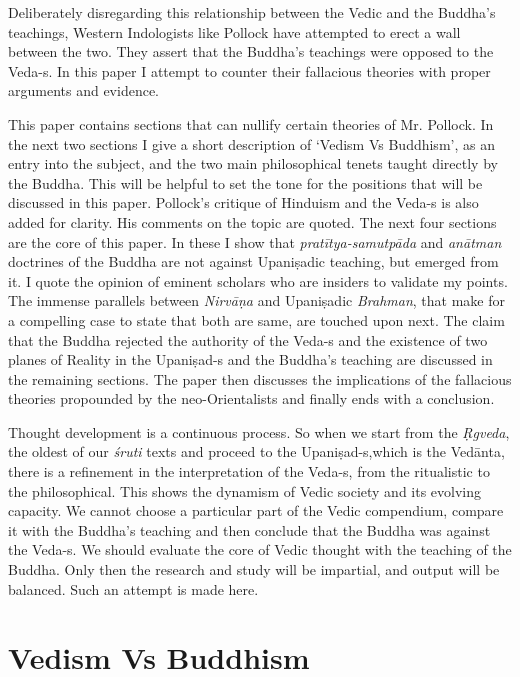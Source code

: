Deliberately disregarding this relationship between the Vedic and the Buddha’s teachings, Western Indologists like Pollock have attempted to erect a wall between the two. They assert that the Buddha’s teachings were opposed to the Veda-s. In this paper I attempt to counter their fallacious theories with proper arguments and evidence.

This paper contains sections that can nullify certain theories of Mr. Pollock. In the next two sections I give a short description of ‘Vedism Vs Buddhism’, as an entry into the subject, and the two main philosophical tenets taught directly by the Buddha. This will be helpful to set the tone for the positions that will be discussed in this paper. Pollock’s critique of Hinduism and the Veda-s is also added for clarity. His comments on the topic are quoted. The next four sections are the core of this paper. In these I show that \textit{pratītya-samutpāda} and \textit{anātman} doctrines of the Buddha are not against Upaniṣadic teaching, but emerged from it. I quote the opinion of eminent scholars who are insiders to validate my points. The immense parallels between \textit{Nirvāṇa} and Upaniṣadic \textit{Brahman}, that make for a compelling case to state that both are same, are touched upon next. The claim that the Buddha rejected the authority of the Veda-s and the existence of two planes of Reality in the Upaniṣad-s and the Buddha’s teaching are discussed in the remaining sections. The paper then discusses the implications of the fallacious theories propounded by the neo-Orientalists and finally ends with a conclusion.

\eject

Thought development is a continuous process. So when we start from the \textit{Ṛgveda}, the oldest of our \textit{śruti} texts and proceed to the Upaniṣad-s,\break which is the Vedānta, there is a refinement in the interpretation of the Veda-s, from the ritualistic to the philosophical. This shows the dynamism of Vedic society and its evolving capacity. We cannot choose a particular part of the Vedic compendium, compare it with the Buddha’s teaching and then conclude that the Buddha was against the Veda-s. We should evaluate the core of Vedic thought with the teaching of the Buddha. Only then the research and study will be impartial, and output will be balanced. Such an attempt is made here.


\section*{Vedism Vs Buddhism}

